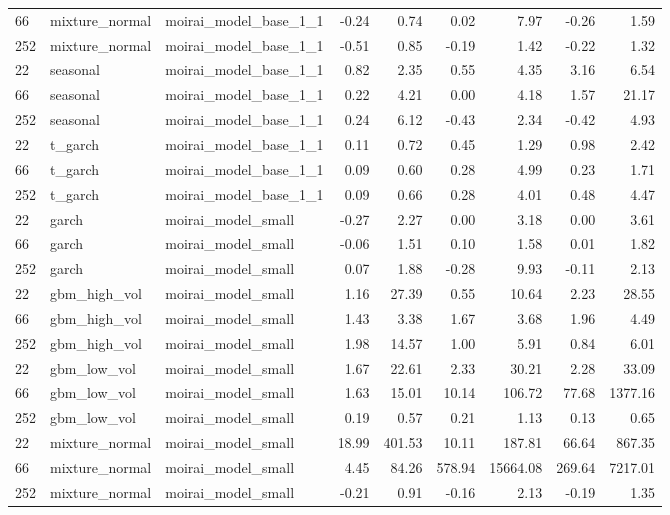 {\begin{tabular}{lllrrrrrr}
66 & mixture\_normal & moirai\_model\_base\_1\_1 & -0.24 & 0.74 & 0.02 & 7.97 & -0.26 & 1.59 \\
252 & mixture\_normal & moirai\_model\_base\_1\_1 & -0.51 & 0.85 & -0.19 & 1.42 & -0.22 & 1.32 \\
\midrule
22 & seasonal & moirai\_model\_base\_1\_1 & 0.82 & 2.35 & 0.55 & 4.35 & 3.16 & 6.54 \\
66 & seasonal & moirai\_model\_base\_1\_1 & 0.22 & 4.21 & 0.00 & 4.18 & 1.57 & 21.17 \\
252 & seasonal & moirai\_model\_base\_1\_1 & 0.24 & 6.12 & -0.43 & 2.34 & -0.42 & 4.93 \\
\midrule
22 & t\_garch & moirai\_model\_base\_1\_1 & 0.11 & 0.72 & 0.45 & 1.29 & 0.98 & 2.42 \\
66 & t\_garch & moirai\_model\_base\_1\_1 & 0.09 & 0.60 & 0.28 & 4.99 & 0.23 & 1.71 \\
252 & t\_garch & moirai\_model\_base\_1\_1 & 0.09 & 0.66 & 0.28 & 4.01 & 0.48 & 4.47 \\
\midrule
22 & garch & moirai\_model\_small & -0.27 & 2.27 & 0.00 & 3.18 & 0.00 & 3.61 \\
66 & garch & moirai\_model\_small & -0.06 & 1.51 & 0.10 & 1.58 & 0.01 & 1.82 \\
252 & garch & moirai\_model\_small & 0.07 & 1.88 & -0.28 & 9.93 & -0.11 & 2.13 \\
\midrule
22 & gbm\_high\_vol & moirai\_model\_small & 1.16 & 27.39 & 0.55 & 10.64 & 2.23 & 28.55 \\
66 & gbm\_high\_vol & moirai\_model\_small & 1.43 & 3.38 & 1.67 & 3.68 & 1.96 & 4.49 \\
252 & gbm\_high\_vol & moirai\_model\_small & 1.98 & 14.57 & 1.00 & 5.91 & 0.84 & 6.01 \\
\midrule
22 & gbm\_low\_vol & moirai\_model\_small & 1.67 & 22.61 & 2.33 & 30.21 & 2.28 & 33.09 \\
66 & gbm\_low\_vol & moirai\_model\_small & 1.63 & 15.01 & 10.14 & 106.72 & 77.68 & 1377.16 \\
252 & gbm\_low\_vol & moirai\_model\_small & 0.19 & 0.57 & 0.21 & 1.13 & 0.13 & 0.65 \\
\midrule
22 & mixture\_normal & moirai\_model\_small & 18.99 & 401.53 & 10.11 & 187.81 & 66.64 & 867.35 \\
66 & mixture\_normal & moirai\_model\_small & 4.45 & 84.26 & 578.94 & 15664.08 & 269.64 & 7217.01 \\
252 & mixture\_normal & moirai\_model\_small & -0.21 & 0.91 & -0.16 & 2.13 & -0.19 & 1.35 \\

\end{tabular}}
